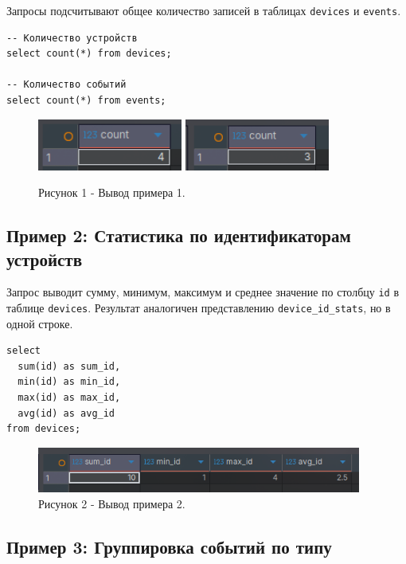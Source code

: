 \documentclass[oneside,a4paper,14pt]{extarticle}
\begin{document}
Запросы подсчитывают общее количество записей в таблицах \texttt{devices} и \texttt{events}.

\begin{verbatim}
-- Количество устройств
select count(*) from devices;

-- Количество событий
select count(*) from events;
\end{verbatim}

\begin{figure}[H]
  \centering
  \includegraphics[width=0.425\textwidth]{pics/devices_count.png}
  \includegraphics[width=0.425\textwidth]{pics/events_count.png}
  \caption*{Рисунок 1 - Вывод примера 1.}
\end{figure}

\subsection*{Пример 2: Статистика по идентификаторам устройств}

Запрос выводит сумму, минимум, максимум и среднее значение по столбцу \texttt{id} в таблице \texttt{devices}. Результат аналогичен представлению \texttt{device\_id\_stats}, но в одной строке.

\begin{verbatim}
select 
  sum(id) as sum_id,
  min(id) as min_id, 
  max(id) as max_id, 
  avg(id) as avg_id
from devices;
\end{verbatim}

\begin{figure}[H]
  \centering
  \includegraphics[width=0.95\textwidth]{pics/id_stats.png}
  \caption*{Рисунок 2 - Вывод примера 2.}
\end{figure}

\subsection*{Пример 3: Группировка событий по типу}
\end{document}
